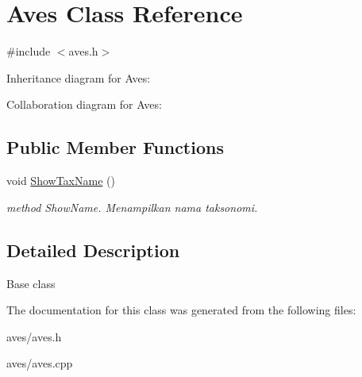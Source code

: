 \hypertarget{classAves}{}\section{Aves Class Reference}
\label{classAves}


{\ttfamily \#include $<$aves.\+h$>$}



Inheritance diagram for Aves\+:


Collaboration diagram for Aves\+:
\subsection*{Public Member Functions}
\begin{DoxyCompactItemize}
\item 
void \hyperlink{classAves_a6a1aa2435bf6b8f1ef7957c70a86e22e}{Show\+Tax\+Name} ()\hypertarget{classAves_a6a1aa2435bf6b8f1ef7957c70a86e22e}{}\label{classAves_a6a1aa2435bf6b8f1ef7957c70a86e22e}

\begin{DoxyCompactList}\small\item\em method Show\+Name. Menampilkan nama taksonomi. \end{DoxyCompactList}\end{DoxyCompactItemize}


\subsection{Detailed Description}
Base class 

The documentation for this class was generated from the following files\+:\begin{DoxyCompactItemize}
\item 
aves/aves.\+h\item 
aves/aves.\+cpp\end{DoxyCompactItemize}
